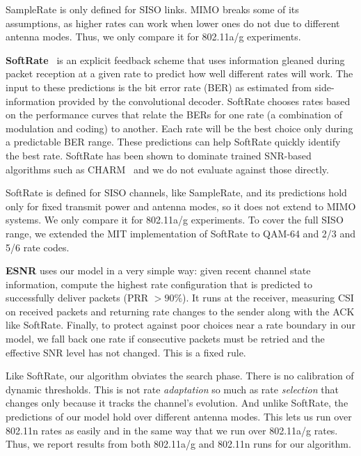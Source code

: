 SampleRate is only defined for SISO links. MIMO breaks some of its assumptions, as higher rates can work when lower ones do not due to different antenna modes. Thus, we only compare it for 802.11a/g experiments. 

\textbf{SoftRate}~\cite{Vutukuru_SoftRate} is an explicit feedback scheme that uses information gleaned during packet reception at a given rate to predict how well different rates will work. The input to these predictions is the bit error rate (BER) as estimated from side-information provided by the convolutional decoder. SoftRate chooses rates based on the performance curves that relate the BERs for one rate (a combination of modulation and coding) to another. %
Each rate will be the best choice only during a predictable BER range. These predictions can help SoftRate quickly identify the best rate. SoftRate has been shown to dominate trained SNR-based algorithms such as CHARM~\cite{Judd_CHARM} and we do not evaluate against those directly.


SoftRate is defined for SISO channels, like SampleRate, 
and its predictions hold only for fixed transmit power and antenna modes, so it does not extend to MIMO systems.
We only compare it for 802.11a/g experiments. 
To cover the full SISO range, we extended the MIT implementation of SoftRate to QAM-64 and 2/3 and 5/6 rate codes.

\textbf{ESNR} uses our model in a very simple way: given recent channel state information, compute the highest rate configuration that is predicted to successfully deliver packets (PRR $>90\%$). It runs at the receiver, measuring CSI on received packets and returning rate changes to the sender along with the ACK like SoftRate. Finally, to protect against poor choices near a rate boundary in our model, we fall back one rate if consecutive packets must be retried and the effective SNR level has not changed. This is a fixed rule.

Like SoftRate, our algorithm obviates the search phase. There is no calibration of dynamic thresholds. This is not rate \emph{adaptation} so much as rate \emph{selection} that changes only because it tracks the channel's evolution. And unlike SoftRate, the predictions of our model hold over different antenna modes. This lets us run over 802.11n rates as easily and in the same way that we run over 802.11a/g rates. Thus, we report results from both 802.11a/g and 802.11n runs for our algorithm.

